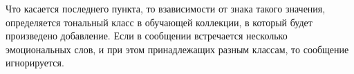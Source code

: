     Что касается последнего пункта, то взависимости от знака такого значения,
    определяется тональный класс в обучающей коллекции, в который будет
    произведено добавление. Если в сообщении встречается несколько эмоциональных
    слов, и при этом принадлежащих разным классам, то сообщение игнорируется.
